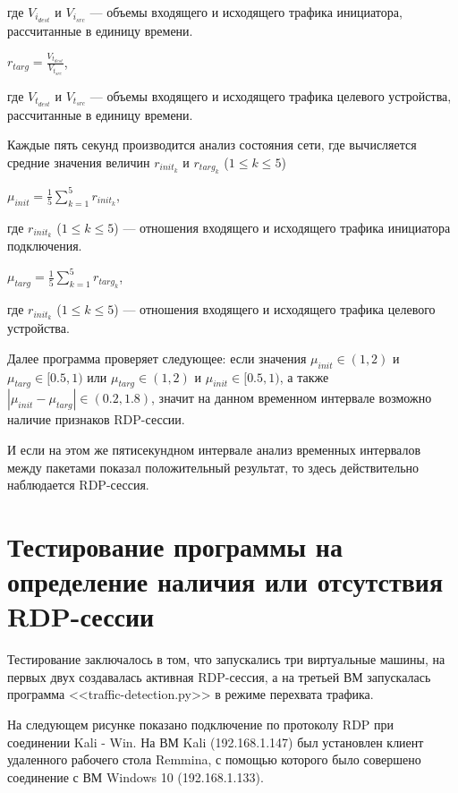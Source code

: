 \documentclass[bachelor, och, coursework]{SCWorks}
\begin{document}
где $V_{i_{dest}}$ и $V_{i_{src}}$ --- объемы входящего и исходящего трафика инициатора, рассчитанные в единицу времени. 

\begin{center}
  $r_{targ} = \frac{V_{t_{dest}}}{V_{t_{src}}}$,
\end{center}

где $V_{t_{dest}}$ и $V_{t_{src}}$ --- объемы входящего и исходящего трафика целевого устройства, рассчитанные в единицу времени. 

Каждые пять секунд производится анализ состояния сети, где вычисляется средние значения величин $r_{init_{k}}$ и $r_{targ_{k}}$ ($1 \leq k \leq 5$)

\begin{center}
  $\mu_{init} = \frac{1}{5}\sum_{k = 1}^{5} r_{init_{k}}$,
\end{center}

где $r_{init_{k}}$ ($1 \leq k \leq 5$) --- отношения входящего и исходящего трафика инициатора подключения.


\begin{center}
  $\mu_{targ} = \frac{1}{5}\sum_{k = 1}^{5} r_{targ_{k}}$,
\end{center}

где $r_{init_{k}}$ ($1 \leq k \leq 5$) --- отношения входящего и исходящего трафика целевого устройства.

Далее программа проверяет следующее: если значения $\mu_{init} \in (1, 2) $ и $\mu_{targ} \in [0.5, 1)$ или 
$\mu_{targ} \in (1, 2) $ и $\mu_{init} \in [0.5, 1)$, а также $|\mu_{init} - \mu_{targ}| \in (0.2, 1.8)$, значит 
на данном временном интервале возможно наличие признаков RDP-сессии. 

И если на этом же пятисекундном интервале анализ временных интервалов между пакетами показал положительный результат, то здесь действительно
наблюдается RDP-сессия.


\section{Тестирование программы на определение наличия или отсутствия RDP-сессии}

Тестирование заключалось в том, что запускались три виртуальные машины, на первых двух создавалась активная RDP-сессия,
а на третьей ВМ запускалась программа <<traffic-detection.py>> в режиме перехвата трафика.

На следующем рисунке показано подключение по протоколу RDP при соединении Kali - Win. На ВМ Kali (192.168.1.147) был установлен клиент удаленного
рабочего стола Remmina, с помощью которого было совершено соединение с ВМ Windows 10 (192.168.1.133).
\end{document}
